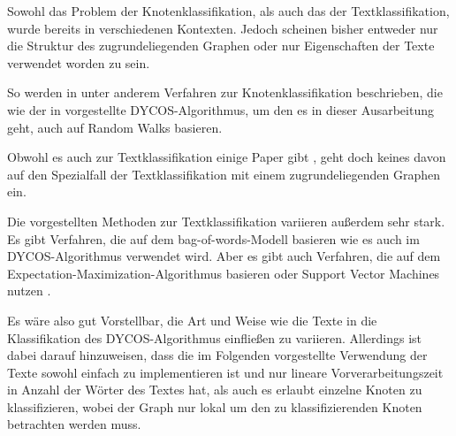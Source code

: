 Sowohl das Problem der Knotenklassifikation, als auch das der
Textklassifikation, wurde bereits in verschiedenen Kontexten. Jedoch scheinen
bisher entweder nur die Struktur des zugrundeliegenden Graphen oder nur
Eigenschaften der Texte verwendet worden zu sein.

So werden in \cite{bhagat,szummer} unter anderem Verfahren zur
Knotenklassifikation beschrieben, die wie der in \cite{aggarwal2011}
vorgestellte DYCOS-Algorithmus, um den es in dieser Ausarbeitung geht, auch auf
Random Walks basieren.

Obwohl es auch zur Textklassifikation einige Paper gibt
\cite{Zhu02learningfrom,Jiang2010302}, geht doch keines davon auf den
Spezialfall der Textklassifikation mit einem zugrundeliegenden Graphen ein.

Die vorgestellten Methoden zur Textklassifikation variieren außerdem sehr
stark. Es gibt Verfahren, die auf dem bag-of-words-Modell basieren
\cite{Ko:2012:STW:2348283.2348453} wie es auch im DYCOS-Algorithmus verwendet
wird. Aber es gibt auch Verfahren, die auf dem
Expectation-Maximization-Algorithmus basieren \cite{Nigam99textclassification}
oder Support Vector
Machines nutzen \cite{Joachims98textcategorization}.

Es wäre also gut Vorstellbar, die Art und Weise wie die Texte in die
Klassifikation des DYCOS-Algorithmus einfließen zu variieren. Allerdings ist
dabei darauf hinzuweisen, dass die im Folgenden vorgestellte Verwendung der
Texte sowohl einfach zu implementieren ist und nur lineare Vorverarbeitungszeit
in Anzahl der Wörter des Textes hat, als auch es erlaubt einzelne Knoten zu
klassifizieren, wobei der Graph nur lokal um den zu klassifizierenden Knoten
betrachten werden muss.
